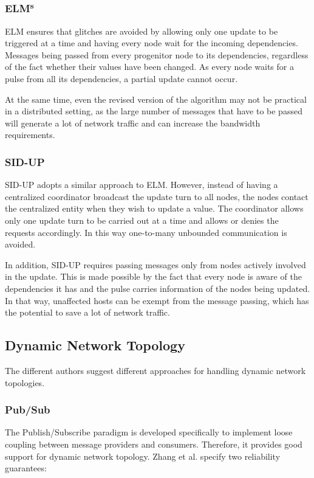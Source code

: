 \documentclass{sigplanconf}
\begin{document}
\subsubsection{ELM\textsuperscript{s}}
ELM \cite{elm} ensures that glitches are avoided by allowing only one update to be triggered at a time and having every node wait for the incoming dependencies. Messages being passed from every progenitor node to its dependencies, regardless of the fact whether their values have been changed. As every node waits for a pulse from all its dependencies, a partial update cannot occur. 

At the same time, even the revised version of the algorithm may not be practical in a distributed setting, as the large number of messages that have to be passed will generate a lot of network traffic and can increase the bandwidth requirements.

\subsubsection{SID-UP}
SID-UP \cite{sidup} adopts a similar approach to ELM. However, instead of having a centralized coordinator broadcast the update turn to all nodes, the nodes contact the centralized entity when they wish to update a value. The coordinator allows only one update turn to be carried out at a time and allows or denies the requests accordingly. In this way one-to-many unbounded communication is avoided. 

In addition, SID-UP requires passing messages only from nodes actively involved in the update. This is made possible by the fact that every node is aware of the dependencies it has and the pulse carries information of the nodes being updated. In that way, unaffected hosts can be exempt from the message passing, which has the potential to save a lot of network traffic.

\subsection{Dynamic Network Topology}

The different authors suggest different approaches for handling dynamic network topologies.

\subsubsection{Pub/Sub}
The Publish/Subscribe paradigm is developed specifically to implement loose coupling between message providers and consumers. Therefore, it provides good support for dynamic network topology. Zhang et al. \cite{totalorder} specify two reliability guarantees:
\end{document}
